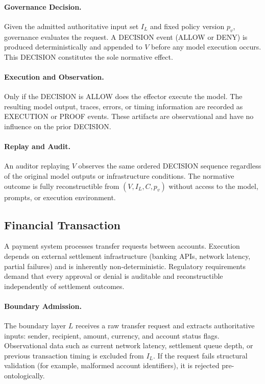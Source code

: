 \documentclass[11pt]{article}
\begin{document}
\paragraph{Governance Decision.}
Given the admitted authoritative input set $I_L$ and fixed policy version $p_v$, governance evaluates the request. A DECISION event (ALLOW or DENY) is produced deterministically and appended to $V$ before any model execution occurs. This DECISION constitutes the sole normative effect.

\paragraph{Execution and Observation.}
Only if the DECISION is ALLOW does the effector execute the model. The resulting model output, traces, errors, or timing information are recorded as EXECUTION or PROOF events. These artifacts are observational and have no influence on the prior DECISION.

\paragraph{Replay and Audit.}
An auditor replaying $V$ observes the same ordered DECISION sequence regardless of the original model outputs or infrastructure conditions. The normative outcome is fully reconstructible from $(V, I_L, C, p_v)$ without access to the model, prompts, or execution environment.

\subsection{Financial Transaction}

A payment system processes transfer requests between accounts. Execution depends on external settlement infrastructure (banking APIs, network latency, partial failures) and is inherently non-deterministic. Regulatory requirements demand that every approval or denial is auditable and reconstructible independently of settlement outcomes.

\paragraph{Boundary Admission.}
The boundary layer $L$ receives a raw transfer request and extracts authoritative inputs: sender, recipient, amount, currency, and account status flags. Observational data such as current network latency, settlement queue depth, or previous transaction timing is excluded from $I_L$. If the request fails structural validation (for example, malformed account identifiers), it is rejected pre-ontologically.
\end{document}
